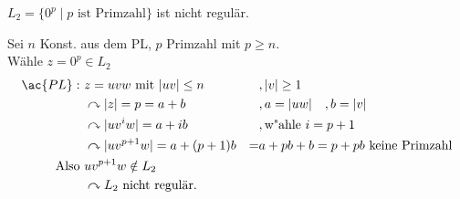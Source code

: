 \begin{Bsp*}
$L_2 = \{0^p \mid p\text{ ist Primzahl}\}$ ist nicht regulär.

Sei $n$ Konst. aus dem \ac{PL}, $p$ Primzahl mit $p \geq n$.\\
Wähle $z=0^p \in L_2$
\begin{align*}
	\ac{PL}:\ &z=uvw \text{ mit } |uv|\leq n &&,|v| \geq 1\\
	&\curvearrowright |z|= p=a+b &&, a = |uw| \quad, b= |v|\\
	&\curvearrowright |uv^iw| = a + ib &&, \text{w"ahle }i=p+1\\
	&\curvearrowright |uv^{p+1}w| = a + (p+1)b & =& a + pb + b = p+pb \text{ keine Primzahl} \\
	\text{Also } &uv^{p+1}w \notin L_2\\
	&\curvearrowright L_2\text{ nicht regulär.}
\end{align*}
\end{Bsp*}


